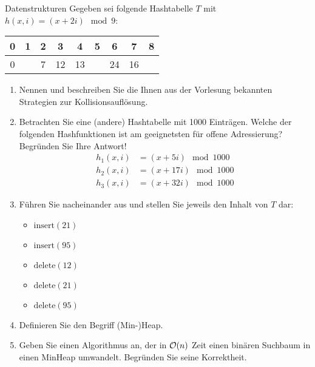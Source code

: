 \documentclass{article}
\begin{document}
\begin{exercise}{Datenstrukturen}
  Gegeben sei folgende Hashtabelle $T$ mit $h(x, i) = (x + 2i) \mod 9$:
  \begin{tabular}{c|c|c|c|c|c|c|c|c}
    0 & 1 & 2 & 3  & 4  & 5 & 6  & 7  & 8 \\
    \hline
    0 &   & 7 & 12 & 13 &   & 24 & 16 &   \\
  \end{tabular}
  \begin{enumerate}
    \item Nennen und beschreiben Sie die Ihnen aus der Vorlesung bekannten Strategien zur Kollisionsauflösung.
    \item Betrachten Sie eine (andere) Hashtabelle mit 1000 Einträgen. Welche der folgenden Hashfunktionen ist am geeignetsten für offene Adressierung? Begründen Sie Ihre Antwort!
          \begin{align*}
            h_1(x, i) & = (x + 5i) \mod 1000  \\
            h_2(x, i) & = (x + 17i) \mod 1000 \\
            h_3(x, i) & = (x + 32i) \mod 1000
          \end{align*}
    \item Führen Sie nacheinander aus und stellen Sie jeweils den Inhalt von $T$ dar:
          \begin{itemize}
            \item $\text{insert}(21)$
            \item $\text{insert}(95)$
            \item $\text{delete}(12)$
            \item $\text{delete}(21)$
            \item $\text{delete}(95)$
          \end{itemize}
    \item Definieren Sie den Begriff (Min-)Heap.
    \item Geben Sie einen Algorithmus an, der in $\mathcal{O}(n)$ Zeit einen binären Suchbaum in einen MinHeap umwandelt. Begründen Sie seine Korrektheit.
  \end{enumerate}
\end{exercise}
\end{document}
